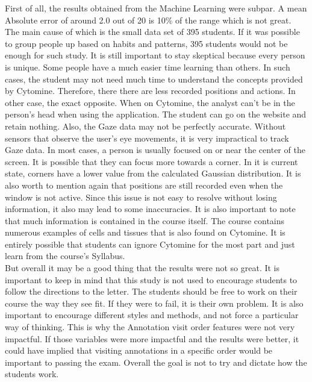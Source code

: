 \documentclass[a4paper,11pt]{report}
\numberwithin{figure}{chapter} %
\begin{document}
        First of all, the results obtained from the Machine Learning were subpar.
        A mean Absolute error of around 2.0 out of 20 is 10\% of the range which is not great.
        The main cause of which is the small data set of 395 students.
        If it was possible to group people up based on habits and patterns, 395 students would not be enough for such study.
        It is still important to stay skeptical because every person is unique.
        Some people have a much easier time learning than others.
        In such cases, the student may not need much time to understand the concepts provided by Cytomine.
        Therefore, there there are less recorded positions and actions.
        In other case, the exact opposite.
        When on Cytomine, the analyst can't be in the person's head when using the application.
        The student can go on the website and retain nothing.
        Also, the Gaze data may not be perfectly accurate.
        Without sensors that observe the user's eye movements, it is very impractical to track Gaze data.
        In most cases, a person is usually focused on or near the center of the screen.
        It is possible that they can focus more towards a corner.
        In it is current state, corners have a lower value from the calculated Gaussian distribution.
        It is also worth to mention again that positions are still recorded even when the window is not active.
        Since this issue is not easy to resolve without losing information, it also may lead to some inaccuracies.
        It is also important to note that much information is contained in the course itself.
        The course contains numerous examples of cells and tissues that is also found on Cytomine.
        It is entirely possible that students can ignore Cytomine for the most part and just learn from the course's Syllabus.\\


        But overall it may be a good thing that the results were not so great.
        It is important to keep in mind that this study is not used to encourage students to follow the directions to the letter.
        The students should be free to work on their course the way they see fit.
        If they were to fail, it is their own problem.
        It is also important to encourage different styles and methods, and not force a particular way of thinking.
        This is why the Annotation visit order features were not very impactful.
        If those variables were more impactful and the results were better, it could have implied that visiting annotations in a specific order would be important to passing the exam.
        Overall the goal is not to try and dictate how the students work.\\
\end{document}
